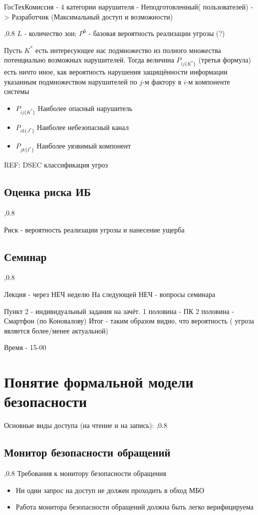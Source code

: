 \documentclass[a4paper,12pt]{report}
\begin{document}
		ГосТехКомиссия - 4 категории нарушителя - Неподготовленный( пользователей) -> Разработчик (Максимальный доступ и возможности)

		,0.8
		$L$ - количество зон;
		$P^{\mbox{б}}$ - базовая вероятность реализации угрозы (?)

		Пусть $K^*$ есть интересующее нас подмножество из полного множества потенциально возможных нарушителей. Тогда величина $P_{ij\{K^*\}}$ (третья формула) есть ничто иное, как вероятность нарушения защищённости информации указанным подмножеством нарушителей по $j$-м фактору в $i$-м компоненте системы
		\begin{itemize}
			\item $P_{ij\{K^*\}}$		Наиболее опасный нарушитель
			\item $P_{ik\{J^*\}}$		Наиболее небезопасный канал
			\item $P_{jk\{I^*\}}$		Наиболее уязвимый компонент
		\end{itemize}

		REF: DSEC классификация угроз

		\subsection{Оценка риска ИБ}
		,0.8

		Риск - вероятность реализации угрозы и нанесение ущерба

	\subsection{Семинар}
		,0.8

		Лекция - через НЕЧ неделю
		На следующей НЕЧ - вопросы семинара

		Пункт 2 - индивидуальный задания на зачёт.
		1 половина  - ПК
		2 половина - Смартфон
		(по Коновалову)
		Итог  - таким  образом видно, что вероятность ( угроза является более/менее актуальной)

		Время - 15-00


	\section{Понятие формальной модели безопасности}
	Основные виды доступа (на чтение и на запись):
	,0.8
	
	\subsection{Монитор безопасности обращений}
	,0.8
	Требования к монитору безопасности обращения
	\begin{itemize}
		\item Ни один запрос на доступ не должен проходить в обход МБО
		\item Работа монитора безопасности обращений должна быть легко верифицируема
	\end{itemize}
\end{document}
